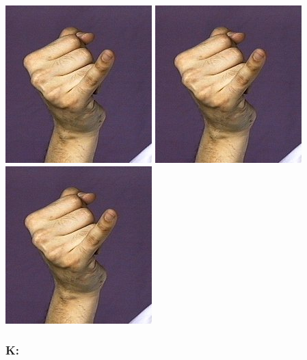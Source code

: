 \documentclass{article}
\begin{document}
\includegraphics[scale=0.5]{images/j10.jpg}
\includegraphics[scale=0.5]{images/j11.jpg}
\includegraphics[scale=0.5]{images/j12.jpg}

\subsubsection{K:}
\end{document}
